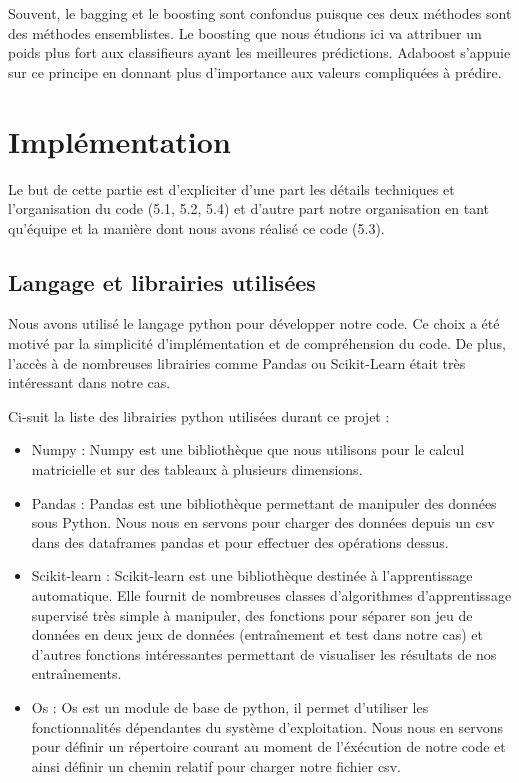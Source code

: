 \documentclass{article}
\begin{document}
Souvent, le bagging et le boosting sont confondus puisque ces deux méthodes sont des méthodes ensemblistes. Le boosting que nous étudions ici va attribuer un poids plus fort aux classifieurs ayant les meilleures prédictions. Adaboost s'appuie sur ce principe en donnant plus d'importance aux valeurs compliquées à prédire.


\section{Implémentation}
Le but de cette partie est d'expliciter d'une part les détails techniques et l'organisation du code (5.1, 5.2, 5.4) et d'autre part notre organisation en tant qu'équipe et la manière dont nous avons réalisé ce code (5.3).

\subsection{Langage et librairies utilisées}
Nous avons utilisé le langage python pour développer notre code. Ce choix a été motivé par la simplicité d'implémentation et de compréhension du code. De plus, l'accès à de nombreuses librairies comme Pandas ou Scikit-Learn était très intéressant dans notre cas. 

Ci-suit la liste des librairies python utilisées durant ce projet : 
\begin{itemize}
  \item Numpy : Numpy est une bibliothèque que nous utilisons pour le calcul matricielle et sur des tableaux à plusieurs dimensions.
  \item Pandas : Pandas est une bibliothèque permettant de manipuler des données sous Python. Nous nous en servons pour charger des données depuis un csv dans des dataframes pandas et pour effectuer des opérations dessus.
  \item Scikit-learn : Scikit-learn est une bibliothèque destinée à l'apprentissage automatique. Elle fournit de nombreuses classes d'algorithmes d'apprentissage supervisé très simple à manipuler, des fonctions pour séparer son jeu de données en deux jeux de données (entraînement et test dans notre cas) et d'autres fonctions intéressantes permettant de visualiser les résultats de nos entraînements.
  \item Os : Os est un module de base de python, il permet d'utiliser les fonctionnalités dépendantes du système d'exploitation. Nous nous en servons pour définir un répertoire courant au moment de l'éxécution de notre code et ainsi définir un chemin relatif pour charger notre fichier csv.
\end{itemize}
\end{document}
